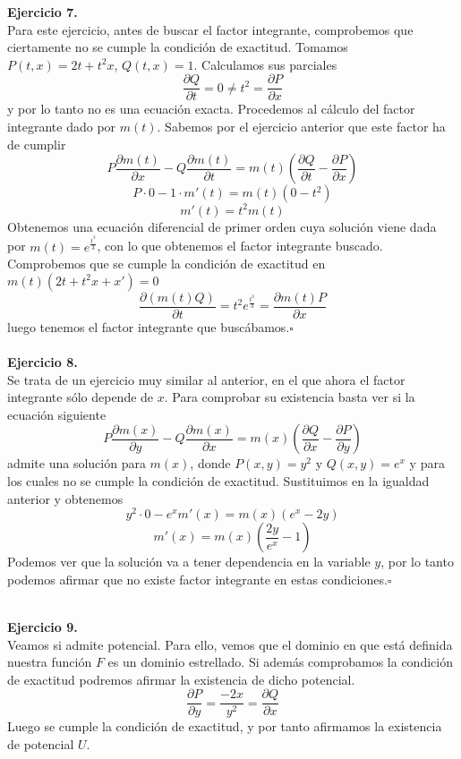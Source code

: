 \documentclass[fleqn]{article}
\newcommand*{\QED}{\hfill\ensuremath{\square}}
\begin{document}
    \newpage

    {\bf{Ejercicio 7.}} \\

    Para este ejercicio, antes de buscar el factor integrante, comprobemos que ciertamente no se cumple la condición de exactitud. Tomamos 
    $P(t,x)=2t+t^2x$, $Q(t,x)=1$. Calculamos sus parciales
    $$\frac{\partial Q}{\partial t}=0 \neq t^2=\frac{\partial P}{\partial x}$$
    y por lo tanto no es una ecuación exacta. Procedemos al cálculo del factor integrante dado por $m(t)$. Sabemos por el ejercicio anterior que
    este factor ha de cumplir
    $$P\frac{\partial m(t)}{\partial x}-Q\frac{\partial m(t)}{\partial t}=m(t) \left(\frac{\partial Q}{\partial t}-\frac{\partial P}{\partial x}\right)$$
    $$P\cdot 0-1 \cdot m'(t)=m(t) \left(0-t^2\right)$$
    $$m'(t)=t^2m(t)$$
    Obtenemos una ecuación diferencial de primer orden cuya solución viene dada por $m(t)=e^{\frac{t^3}{3}}$, con lo que obtenemos el factor integrante
    buscado. Comprobemos que se cumple la condición de exactitud en $m(t)\left(2t+t^2x+x'\right)=0$
    $$\frac{\partial (m(t)Q)}{\partial t}=t^2e^{\frac{t^3}{3}}=\frac{\partial m(t)P}{\partial x}$$
    luego tenemos el factor integrante que buscábamos.\QED \\ \\

    {\bf{Ejercicio 8.}} \\

    Se trata de un ejercicio muy similar al anterior, en el que ahora el factor integrante sólo depende de $x$. Para comprobar su existencia basta ver si
    la ecuación siguiente 
    $$P\frac{\partial m(x)}{\partial y}-Q\frac{\partial m(x)}{\partial x}=m(x) \left(\frac{\partial Q}{\partial x}-\frac{\partial P}{\partial y}\right)$$
    admite una solución para $m(x)$, donde $P(x,y)=y^2$ y $Q(x,y)=e^x$ y para los cuales no se cumple la condición de exactitud. Sustituimos en la 
    igualdad anterior y obtenemos
    $$y^2 \cdot 0-e^xm'(x)=m(x)\left(e^x-2y\right)$$
    $$m'(x)=m(x)\left(\frac{2y}{e^x}-1\right)$$
    Podemos ver que la solución va a tener dependencia en la variable $y$, por lo tanto podemos afirmar que no existe 
    factor integrante en estas condiciones.\QED \\ \\
    
    \newpage

    {\bf{Ejercicio 9.}} \\

    Veamos si admite potencial. Para ello, vemos que el dominio en que está definida nuestra función $F$ es un dominio estrellado. Si además
    comprobamos la condición de exactitud podremos afirmar la existencia de dicho potencial. 
    $$\frac{\partial P}{\partial y} = \frac{-2x}{y^2} = \frac{\partial Q}{\partial x}$$
    Luego se cumple la condición de exactitud, y por tanto afirmamos la existencia de potencial $U$.
\end{document}
